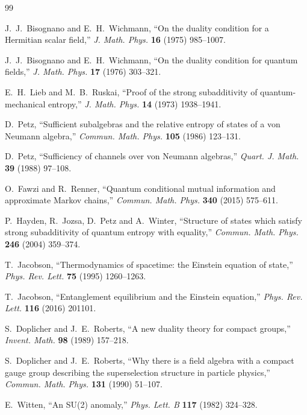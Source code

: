 \documentclass[11pt]{article}
\begin{document}
\begin{thebibliography}{99}

J.~J.~Bisognano and E.~H.~Wichmann,
``On the duality condition for a Hermitian scalar field,''
\emph{J. Math. Phys.} \textbf{16} (1975) 985--1007.

J.~J.~Bisognano and E.~H.~Wichmann,
``On the duality condition for quantum fields,''
\emph{J. Math. Phys.} \textbf{17} (1976) 303--321.

E.~H.~Lieb and M.~B.~Ruskai,
``Proof of the strong subadditivity of quantum-mechanical entropy,''
\emph{J. Math. Phys.} \textbf{14} (1973) 1938--1941.

D.~Petz,
``Sufficient subalgebras and the relative entropy of states of a von Neumann algebra,''
\emph{Commun. Math. Phys.} \textbf{105} (1986) 123--131.

D.~Petz,
``Sufficiency of channels over von Neumann algebras,''
\emph{Quart. J. Math.} \textbf{39} (1988) 97--108.

O.~Fawzi and R.~Renner,
``Quantum conditional mutual information and approximate Markov chains,''
\emph{Commun. Math. Phys.} \textbf{340} (2015) 575--611.

P.~Hayden, R.~Jozsa, D.~Petz and A.~Winter,
``Structure of states which satisfy strong subadditivity of quantum entropy with equality,''
\emph{Commun. Math. Phys.} \textbf{246} (2004) 359--374.

T.~Jacobson,
``Thermodynamics of spacetime: the Einstein equation of state,''
\emph{Phys. Rev. Lett.} \textbf{75} (1995) 1260--1263.

T.~Jacobson,
``Entanglement equilibrium and the Einstein equation,''
\emph{Phys. Rev. Lett.} \textbf{116} (2016) 201101.

S.~Doplicher and J.~E.~Roberts,
``A new duality theory for compact groups,''
\emph{Invent. Math.} \textbf{98} (1989) 157--218.

S.~Doplicher and J.~E.~Roberts,
``Why there is a field algebra with a compact gauge group describing the superselection structure in particle physics,''
\emph{Commun. Math. Phys.} \textbf{131} (1990) 51--107.

E.~Witten,
``An SU(2) anomaly,''
\emph{Phys. Lett. B} \textbf{117} (1982) 324--328.

\end{thebibliography}
\end{document}
